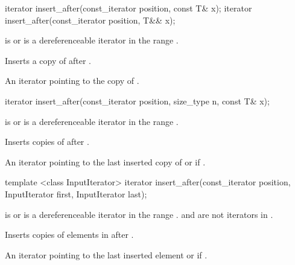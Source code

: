 %
\begin{itemdecl}
iterator insert_after(const_iterator position, const T& x);
iterator insert_after(const_iterator position, T&& x);
\end{itemdecl}

\begin{itemdescr}
\pnum
\requires {} is  or is a dereferenceable
iterator in the range .

\pnum
\effects Inserts a copy of  after .

\pnum
\returns An iterator pointing to the copy of .
\end{itemdescr}

%
\begin{itemdecl}
iterator insert_after(const_iterator position, size_type n, const T& x);
\end{itemdecl}

\begin{itemdescr}
\pnum
\requires {} is  or is a dereferenceable
iterator in the range .

\pnum
\effects Inserts  copies of  after .

\pnum
\returns
An iterator pointing to the last inserted copy of  or  if .
\end{itemdescr}

%
\begin{itemdecl}
template <class InputIterator>
  iterator insert_after(const_iterator position, InputIterator first, InputIterator last);
\end{itemdecl}

\begin{itemdescr}
\pnum
\requires {} is  or is a dereferenceable
iterator in the range .
 and  are not iterators in .

\pnum
\effects Inserts copies of elements in  after .

\pnum
\returns
An iterator pointing to the last inserted element or  if .
\end{itemdescr}


